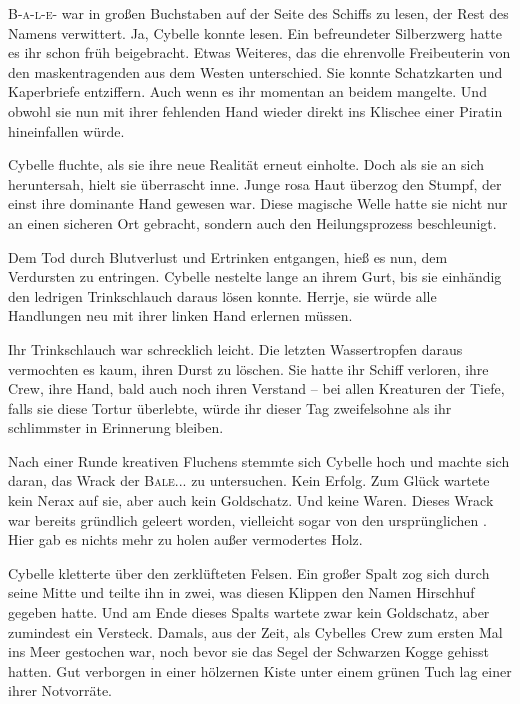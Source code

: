 \textsc{B-a-l-e-} war in großen Buchstaben auf der Seite des Schiffs zu lesen, der Rest des Namens verwittert. Ja, Cybelle konnte lesen. Ein befreundeter Silberzwerg hatte es ihr schon früh beigebracht. Etwas Weiteres, das die ehrenvolle Freibeuterin von den maskentragenden  aus dem Westen unterschied. Sie konnte Schatzkarten und Kaperbriefe entziffern. Auch wenn es ihr momentan an beidem mangelte. Und obwohl sie nun mit ihrer fehlenden Hand wieder direkt ins Klischee einer Piratin hineinfallen würde. 

Cybelle fluchte, als sie ihre neue Realität erneut einholte. Doch als sie an sich heruntersah, hielt sie überrascht inne. Junge rosa Haut überzog den Stumpf, der einst ihre dominante Hand gewesen war. Diese magische Welle hatte sie nicht nur an einen sicheren Ort gebracht, sondern auch den Heilungsprozess beschleunigt. 

Dem Tod durch Blutverlust und Ertrinken entgangen, hieß es nun, dem Verdursten zu entringen. Cybelle nestelte lange an ihrem Gurt, bis sie einhändig den ledrigen Trinkschlauch daraus lösen konnte. Herrje, sie würde alle Handlungen neu mit ihrer linken Hand erlernen müssen. 

Ihr Trinkschlauch war schrecklich leicht. Die letzten Wassertropfen daraus vermochten es kaum, ihren Durst zu löschen. Sie hatte ihr Schiff verloren, ihre Crew, ihre Hand, bald auch noch ihren Verstand – bei allen Kreaturen der Tiefe, falls sie diese Tortur überlebte, würde ihr dieser Tag zweifelsohne als ihr schlimmster in Erinnerung bleiben.

Nach einer Runde kreativen Fluchens stemmte sich Cybelle hoch und machte sich daran, das Wrack der \textsc{Bale...} zu untersuchen. Kein Erfolg. Zum Glück wartete kein Nerax auf sie, aber auch kein Goldschatz. Und keine Waren. Dieses Wrack war bereits gründlich geleert worden, vielleicht sogar von den ursprünglichen . Hier gab es nichts mehr zu holen außer vermodertes Holz.

Cybelle kletterte über den zerklüfteten Felsen. Ein großer Spalt zog sich durch seine Mitte und teilte ihn in zwei, was diesen Klippen den Namen Hirschhuf gegeben hatte. Und am Ende dieses Spalts wartete zwar kein Goldschatz, aber zumindest ein Versteck. Damals, aus der Zeit, als Cybelles Crew zum ersten Mal ins Meer gestochen war, noch bevor sie das Segel der Schwarzen Kogge gehisst hatten. Gut verborgen in einer hölzernen Kiste unter einem grünen Tuch lag einer ihrer Notvorräte.

